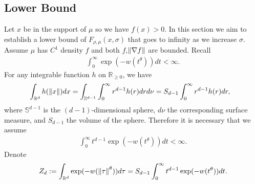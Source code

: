 \documentclass[10pt]{article}
\begin{document}
\subsection*{Lower Bound}
Let $x$ be in the support of $\mu$ so we have $f(x)>0$. In this section we aim
to establish a lower bound of $F_{\rho,\mu}(x,\sigma)$ that goes to infinity as
we increase $\sigma$. Assume $\mu$ has $C^1$ density $f$ and both
$f$,$\left\lVert\nabla f\right\rVert$ are bounded. Recall
\begin{align}
    \int_0^{\infty} \exp(-w(t^{\theta})) dt<\infty.
\end{align}
For any integrable function $h$ on $\mathbb{R}_{\geq 0}$, we have
\begin{align}
     & \int_{\mathbb{R}^d} h(\left\lVert x\right\rVert) dx = \int_{\mathbb{S}^{d-1}} \int_0^{\infty} r^{d-1}h(r) dr d\nu=S_{d-1} \int_0^{\infty} r^{d-1}h(r) dr,
\end{align}
where $\mathbb{S}^{d-1}$ is the $(d-1)$-dimensional sphere, $d\nu$ the corresponding surface measure, and $S_{d-1}$ the volume of the sphere. Therefore it is necessary that we assume
\begin{align}
    \int_0^{\infty} t^{d-1}\exp(-w(t^{\theta})) dt<\infty.
\end{align}
Denote
\begin{align}
    Z_d :=\int_{\mathbb{R}^d}\exp(-w(\left\lVert\tau\right\rVert^{\theta})) d \tau = S_{d-1} \int_0^{\infty} t^{d-1}\exp(-w(t^{\theta})) dt.
\end{align}
\end{document}
